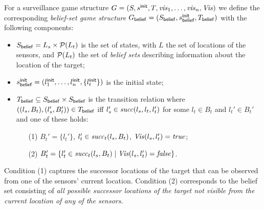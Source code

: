 For a surveillance game structure $G  = (S,s^{\mathsf{init}},T,\mathit{vis}_1,\ldots,\mathit{vis}_n,\mathit{Vis})$ we define the corresponding \emph{belief-set game structure} $G_{\mathsf{belief}}  = (S_{\mathsf{belief}},s^{\mathsf{init}}_{\mathsf{belief}},T_{\mathsf{belief}})$ with the following components:
\begin{itemize}
\item $S_{\mathsf{belief}} = L_s \times \mathcal{P}(L_t)$ is the set of states, with $L$ the set of locations of the sensors, and $\mathcal{P}(L_t)$ the set of \emph{belief sets} describing information about the location of the target;
\item $s^{\mathsf{init}}_{\mathsf{belief}} = (l^{\mathsf{init}}_1,\ldots,l^{\mathsf{init}}_n,\{l_t^{\mathsf{init}}\})$ is the initial state;
\item $T_{\mathsf{belief}} \subseteq S_{\mathsf{belief}} \times S_{\mathsf{belief}}$ is the transition relation where $((l_s, B_t),(l_s', B_t')) \in T_{\mathsf{belief}}$ iff $l_s' \in  \mathit{succ}(l_s,l_t,l_t')$ for some $l_t \in B_t$ and $l_t' \in B_t'$ and one of these holds:
\begin{itemize}
\item[(1)] $B_t' = \{l_t'\}$, $l_t' \in \mathit{succ}_t(l_s,B_t)$, $\mathit{Vis}(l_s,l_t') = \mathit{true}$;
\item[(2)] $B_t' = \{l_t' \in \mathit{succ}_t(l_s,B_t)  \mid  \mathit{Vis}(l_s,l_t') = \mathit{false} \}$.
\end{itemize}
\end{itemize}
Condition (1) captures the successor locations of the target that can be observed from one of the sensors' current location. Condition (2) corresponds to the belief set consisting of \emph{all possible successor locations of the target not visible from the current location of any of the sensors}. 
